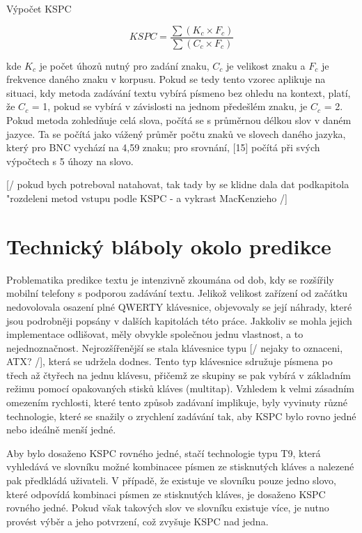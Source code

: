 \documentclass{article}
\begin{document}
Výpočet KSPC


\[
	KSPC = \frac{\sum{ (K_c × F_c) }}{\sum{ (C_c × F_c) }}
\]

kde $K_c$ je počet úhozů nutný pro zadání znaku, $C_c$ je velikost znaku a $F_c$ je frekvence daného znaku v korpusu. Pokud se tedy tento vzorec aplikuje na situaci, kdy metoda zadávání textu vybírá písmeno bez ohledu na kontext, platí, že $C_c$ = 1, pokud se vybírá v závislosti na jednom předešlém znaku, je $C_c$ = 2. Pokud metoda zohledňuje celá slova, počítá se s průměrnou délkou slov v daném jazyce. Ta se počítá jako vážený průměr počtu znaků ve slovech daného jazyka, který pro BNC vychází na 4,59 znaku; pro srovnání, [15] počítá při svých výpočtech s 5 úhozy na slovo.


[/ pokud bych potreboval natahovat, tak tady by se klidne dala dat podkapitola "rozdeleni metod vstupu podle KSPC - a vykrast MacKenzieho  /]


\section{Technický bláboly okolo predikce}


Problematika predikce textu je intenzivně zkoumána od dob, kdy se rozšířily mobilní telefony s podporou zadávání textu. Jelikož velikost zařízení od začátku nedovolovala osazení plné QWERTY klávesnice, objevovaly se její náhrady, které jsou podrobněji popsány v dalších kapitolách této práce. Jakkoliv se mohla jejich implementace odlišovat, měly obvykle společnou jednu vlastnost, a to nejednoznačnost. Nejrozšířenější se stala klávesnice typu  [/ nejaky to oznaceni, ATX? /], která se udržela dodnes. Tento typ klávesnice sdružuje písmena po třech až čtyřech na jednu klávesu, přičemž ze skupiny se pak vybírá v základním režimu pomocí opakovaných stisků kláves (multitap). Vzhledem k velmi zásadním omezením rychlosti, které tento způsob zadávaní implikuje, byly vyvinuty různé technologie, které se snažily o zrychlení zadávání tak, aby KSPC bylo rovno jedné nebo ideálně menší jedné.

Aby bylo dosaženo KSPC rovného jedné, stačí technologie typu T9, která vyhledává ve slovníku možné kombinacee písmen ze stisknutých kláves a nalezené pak předkládá uživateli. V případě, že existuje ve slovníku pouze jedno slovo, které odpovídá kombinaci písmen ze stisknutých kláves, je dosaženo KSPC rovného jedné. Pokud však takových slov ve slovníku existuje více, je nutno provést výběr a jeho potvrzení, což zvyšuje KSPC nad jedna.
\end{document}
